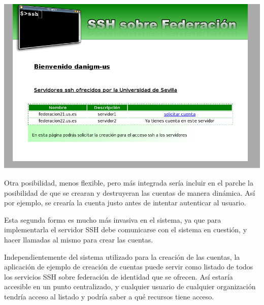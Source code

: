     \begin{center}
        \includegraphics[width=\textwidth]{img/userAdd.png}
    \end{center}

    Otra posibilidad, menos flexible, pero más integrada sería incluir en
    el parche la posibilidad de que se crearan y destruyeran las cuentas
    de manera dinámica. Así por ejemplo, se crearía la cuenta justo antes
    de intentar autenticar al usuario.

    Esta segunda forma es mucho más invasiva en el sistema, ya que para
    implementarla el servidor SSH debe comunicarse con el sistema en
    cuestión, y hacer llamadas al mismo para crear las cuentas.

    Independientemente del sistema utilizado para la creación de las
    cuentas, la aplicación de ejemplo de creación de cuentas puede servir
    como listado de todos los servicios SSH sobre federación de identidad
    que se ofrecen. Así estaría accesible en un punto centralizado, y
    cualquier usuario de cualquier organización tendría acceso al listado y
    podría saber a qué recursos tiene acceso.
